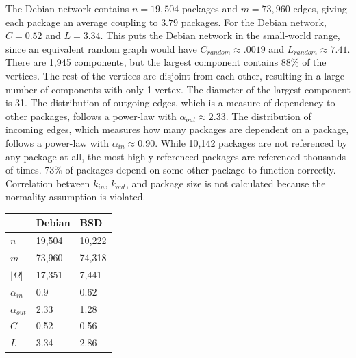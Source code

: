 \documentclass{elsart}
\begin{document}
The Debian network contains $n=19,504$ packages and $m=73,960$ edges, giving each package an average coupling to 
$3.79$ packages. For the Debian network, $C=0.52$ and $L=3.34$. This puts the Debian network in the small-world 
range, since an equivalent random graph would have $C_{random}\approx.0019$ and $L_{random}\approx7.41$. There are 
1,945 components, but the largest component contains 88\% of the vertices. The rest of the vertices are disjoint 
from each other, resulting in a large number of components with only 1 vertex. The diameter of the largest component 
is 31. The distribution of outgoing edges, which is a measure of dependency to other packages, follows a power-law 
with $\alpha_{out}\approx2.33$. The distribution of incoming edges, which measures how many packages are dependent on 
a package, follows a power-law with $\alpha_{in}\approx0.90$. While 10,142 packages are not referenced by any 
package at all, the most highly referenced packages are referenced thousands of times. 73\% of packages depend on some other 
package to function correctly. Correlation between $k_{in}$, $k_{out}$, and package size is not calculated because 
the normality assumption is violated.

\begin{center}
\begin{tabular}{|l||l|l|}
\hline
& Debian & BSD \\ \hline
$n$ & 19,504 & 10,222 \\ \hline
$m$ & 73,960 & 74,318 \\ \hline
$|\Omega|$ & 17,351 & 7,441 \\ \hline
$\alpha_{in}$ & 0.9 & 0.62 \\ \hline
$\alpha_{out}$ & 2.33 & 1.28 \\ \hline
$C$ & 0.52 &  0.56 \\ \hline
$L$ & 3.34 &  2.86 \\ \hline
\end{tabular}
\end{center}
\end{document}
